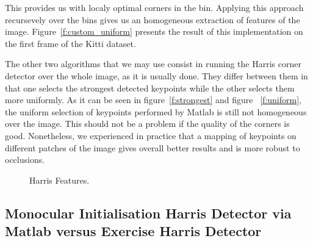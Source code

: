 This provides us with localy optimal corners in
the bin. Applying this approach recursevely over the bins gives us an homogeneous extraction of features of the image. Figure~\ref{f:custom_uniform} 
presents the result of this implementation on the first frame of the Kitti dataset.

The other two algorithms that we may use consist in running the Harris corner detector over the whole image, as it is usually done. They differ between them in that one selects the strongest detected keypoints while the other selects them more uniformly. As it can be seen in figure~\ref{f:strongest} and figure ~\ref{f:uniform}, the uniform selection of keypoints performed by Matlab is still not homogeneous over the image.
This should not be a problem if the quality of the corners is good. Nonetheless, we experienced in practice that a mapping of keypoints on different
patches of the image gives overall better results and is more robust to occlusions.

\begin{figure}[b]
\caption[\label{f:harris}Harris Features]{Harris Features.}
\end{figure}

\subsection{Monocular Initialisation Harris Detector via Matlab versus Exercise Harris Detector}
